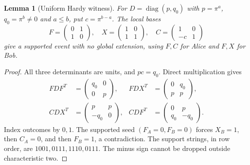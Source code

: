 \documentclass[11pt]{article}
\newtheorem{lemma}[theorem]{Lemma}
\theoremstyle{definition}\newtheorem{definition}[theorem]{Definition}
\theoremstyle{remark}\newtheorem{remark}[theorem]{Remark}
\DeclareMathOperator{\diag}{diag}
\begin{document}
\begin{lemma}[Uniform Hardy witness]\label{lem:hardy}
For $D=\diag(p,q_0)$ with $p=\pi^a$, $q_0=\pi^b\ne0$ and $a\leq b$, put $c=\pi^{b-a}$. The local bases
\[
 F=\begin{pmatrix}0&1\\1&0\end{pmatrix},\quad
 X=\begin{pmatrix}1&0\\1&1\end{pmatrix},\quad
 C=\begin{pmatrix}1&0\\-c&1\end{pmatrix}
\]
give a supported event with no global extension, using $F,C$ for Alice and $F,X$ for Bob.
\end{lemma}
\begin{proof}
All three determinants are units, and $pc=q_0$. Direct multiplication gives
\begin{align*}
 FDF^T&=\begin{pmatrix}q_0&0\\0&p\end{pmatrix},&
 FDX^T&=\begin{pmatrix}0&q_0\\p&p\end{pmatrix},\\
 CDX^T&=\begin{pmatrix}p&p\\-q_0&0\end{pmatrix},&
 CDF^T&=\begin{pmatrix}0&p\\q_0&-q_0\end{pmatrix}.
\end{align*}
Index outcomes by $0,1$. The supported seed $(F_A=0,F_B=0)$ forces $X_B=1$, then $C_A=0$, and then $F_B=1$, a contradiction. The support strings, in row order, are $1001,0111,1110,0111$. The minus sign cannot be dropped outside characteristic two.
\end{proof}
\end{document}
